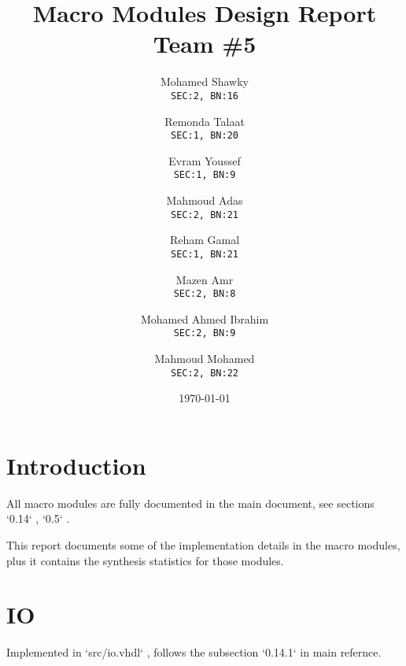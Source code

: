 \documentclass[12pt]{report}
\title{\textbf{Macro Modules Design Report}\\Team \#5}
\author{
  Mohamed Shawky\\
  \small\texttt{SEC:2, BN:16}
  \and
  Remonda Talaat\\
  \small\texttt{SEC:1, BN:20}
  \and
  Evram Youssef\\
  \small\texttt{SEC:1, BN:9}
  \and
  Mahmoud Adas\\
  \small\texttt{SEC:2, BN:21}
  \and
  Reham Gamal\\
  \small\texttt{SEC:1, BN:21}
  \and
  Mazen Amr\\
  \small\texttt{SEC:2, BN:8}
  \and
  Mohamed Ahmed Ibrahim\\
  \small\texttt{SEC:2, BN:9}
  \and
  Mahmoud Mohamed\\
  \small\texttt{SEC:2, BN:22}
}
\date{\today}
\begin{document}
    \thispagestyle{empty}

    \maketitle
    \tableofcontents
    \clearpage


    \section{Introduction}
    All macro modules are fully documented in the main document, see sections `0.14` , `0.5` . 

This report documents some of the implementation details in the macro modules, plus it contains the synthesis statistics for those modules.

    \section{IO}
    Implemented in `src/io.vhdl` , follows the subsection `0.14.1` in main refernce. 
\end{document}
